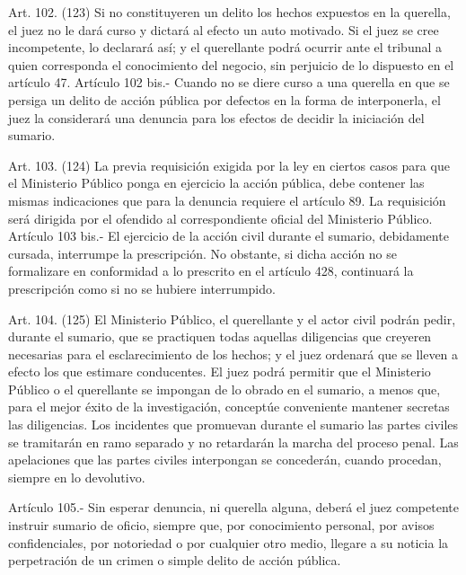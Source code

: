     Art. 102. (123) Si no constituyeren un delito los hechos expuestos en la querella, el juez no le dará curso y dictará al efecto un auto motivado.
    Si el juez se cree incompetente, lo declarará así; y el querellante podrá ocurrir ante el tribunal a quien corresponda el conocimiento del negocio, sin perjuicio de lo dispuesto en el artículo 47.
    Artículo 102 bis.- Cuando no se diere curso a una querella en que se persiga un delito de acción pública por defectos en la forma de interponerla, el juez la considerará una denuncia para los efectos de decidir la iniciación del sumario.

    Art. 103. (124) La previa requisición exigida por la ley en ciertos casos para que el Ministerio Público ponga en ejercicio la acción pública, debe contener las mismas indicaciones que para la denuncia requiere el artículo 89. La requisición será dirigida por el ofendido al correspondiente oficial del Ministerio Público.
    Artículo 103 bis.- El ejercicio de la acción civil durante el sumario, debidamente cursada, interrumpe la prescripción.
    No obstante, si dicha acción no se formalizare en conformidad a lo prescrito en el artículo 428, continuará la prescripción como si no se hubiere interrumpido.

    Art. 104. (125) El Ministerio Público, el querellante y el actor civil podrán pedir, durante el sumario, que se practiquen todas aquellas diligencias que creyeren necesarias para el esclarecimiento de los hechos; y el juez ordenará que se lleven a efecto los que estimare conducentes.
    El juez podrá permitir que el Ministerio Público o el querellante se impongan de lo obrado en el sumario, a menos que, para el mejor éxito de la investigación, conceptúe conveniente mantener secretas las diligencias.
    Los incidentes que promuevan durante el sumario las partes civiles se tramitarán en ramo separado y no retardarán la marcha del proceso penal. Las apelaciones que las partes civiles interpongan se concederán, cuando procedan, siempre en lo devolutivo.

    Artículo 105.- Sin esperar denuncia, ni querella alguna, deberá el juez competente instruir sumario de oficio, siempre que, por conocimiento personal, por avisos confidenciales, por notoriedad o por cualquier otro medio, llegare a su noticia la perpetración de un crimen o simple delito de acción pública.


